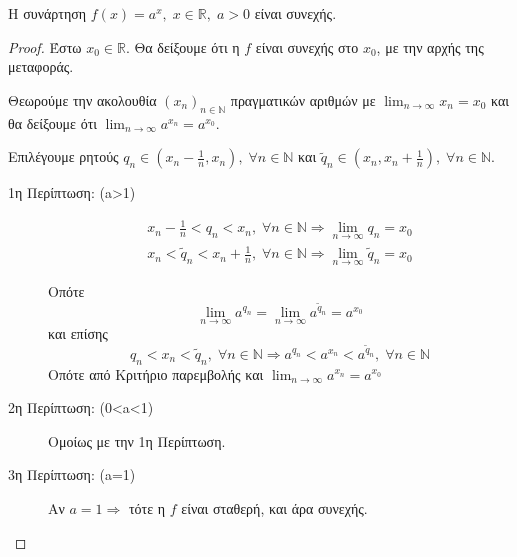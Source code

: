 \documentclass[main.tex]{subfiles}
\begin{document}
        \begin{prop}
            Η συνάρτηση $ f(x) = a^{x}, \; x \in \mathbb{R}, \; a>0 $ είναι συνεχής.
        \end{prop}

        \begin{proof}
        \item {}
            Έστω $ x_{0} \in \mathbb{R} $. Θα δείξουμε ότι η $f$ είναι συνεχής 
            στο $ x_{0} $, με την αρχής της μεταφοράς.

            Θεωρούμε την ακολουθία $ (x_{n})_{n \in \mathbb{N}} $ πραγματικών αριθμών 
            με $ \lim_{n \to \infty} x_{n} = x_{0} $ και θα δείξουμε ότι  
            $\lim_{n \to \infty} a^{x_{n}} = a^{x_{0}}$.

            Επιλέγουμε ρητούς $ q_{n} \in \left(x_{n} - \frac{1}{n}, x_{n}\right), 
            \; \forall n \in \mathbb{N} $ και $ \tilde{q}_{n} \in \left(x_{n}, x_{n}+ 
                \frac{1}{n} \right), \; \forall n \in \mathbb{N} $.

            \begin{description}
                \item [1η Περίπτωση: (a>1)]
                    \begin{gather*}
                        x_{n} - \frac{1}{n} < q_{n} < x_{n}, \; \forall n \in 
                        \mathbb{N} \Rightarrow \lim_{n \to \infty} q_{n} = x_{0} \\
                        x_{n} < \tilde{q}_{n} < x_{n}+ \frac{1}{n}, \; \forall n \in 
                        \mathbb{N} \Rightarrow \lim_{n \to \infty} \tilde{q}_{n} = x_{0}
                    \end{gather*}

                    Οπότε 
                    \[
                        \lim_{n \to \infty} a^{q_{n}} = 
                        \lim_{n \to \infty} a^{\tilde{q}_{n}} = a^{x_{0}}
                    \] 
                    και επίσης
                    \[
                        q_{n} < x_{n} < \tilde{q}_{n}, \; \forall n \in \mathbb{N} 
                        \Rightarrow a^{q_{n}} < a^{x_{n}} < a^{\tilde{q}_{n}}, \; 
                        \forall n \in \mathbb{N}
                    \] 
                    Οπότε από Κριτήριο παρεμβολής και 
                    $ \lim_{n \to \infty} a^{x_{n}} = a^{x_{0}} $ 
                \item [2η Περίπτωση: (0<a<1)]
                    Ομοίως με την 1η Περίπτωση.
                \item [3η Περίπτωση: (a=1)]
                    Αν $ a=1 \Rightarrow $ τότε η $f$ είναι σταθερή, και άρα συνεχής.
            \end{description}
        \end{proof}
\end{document}
